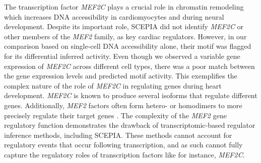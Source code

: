 The transcription factor \textit{MEF2C} plays a crucial role in chromatin remodeling which increases DNA accessibility in cardiomyocytes\cite{Stone2019,Ieda2010,Desjardins2016} and during neural development\cite{Li2008}. Despite its important role, SCEPIA did not identify \textit{MEF2C} or other members of the \textit{MEF2} family, as key cardiac regulators. However, in our comparison based on single-cell DNA accessibility alone, their motif was flagged for its differential inferred activity. Even though we observed a variable gene expression of \textit{MEF2C} across different cell types, there was a poor match between the gene expression levels and predicted motif activity. This exemplifies the complex nature of the role of \textit{MEF2C} in regulating genes during heart development. \textit{MEF2C} is known to produce several isoforms that regulate different genes\cite{Zhu2004}. Additionally, \textit{MEF2} factors often form hetero- or homodimers to more precisely regulate their target genes \cite{Desjardins2016,Black1998}. The complexity of the \textit{MEF2} gene regulatory function demonstrates the drawback of transcriptomic-based regulator inference methods, including SCEPIA. These methods cannot account for regulatory events that occur following transcription, and as such cannot fully capture the regulatory roles of transcription factors like for instance, \textit{MEF2C}.

